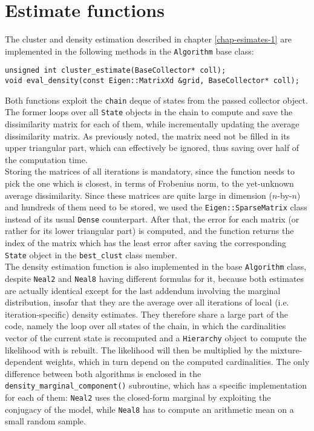 \section{Estimate functions}
The cluster and density estimation described in chapter \ref{chap-esimates-1} are implemented in the following methods in the \verb|Algorithm| base class:
\begin{verbatim}
unsigned int cluster_estimate(BaseCollector* coll);
void eval_density(const Eigen::MatrixXd &grid, BaseCollector* coll);
\end{verbatim}
Both functions exploit the \verb|chain| deque of states from the passed collector object. \\
The former loops over all \verb|State| objects in the chain to compute and save the dissimilarity matrix for each of them, while incrementally updating the average dissimilarity matrix.
As previously noted, the matrix need not be filled in its upper triangular part, which can effectively be ignored, thus saving over half of the computation time. \\
Storing the matrices of all iterations is mandatory, since the function needs to pick the one which is closest, in terms of Frobenius norm, to the yet-unknown average dissimilarity.
Since these matrices are quite large in dimension ($n$-by-$n$) and hundreds of them need to be stored, we used the \verb|Eigen::SparseMatrix| class instead of its usual \verb|Dense| counterpart.
After that, the error for each matrix (or rather for its lower triangular part) is computed, and the function returns the index of the matrix which has the least error after saving the corresponding \verb|State| object in the \verb|best_clust| class member. \\[8pt]
The density estimation function is also implemented in the base \verb|Algorithm| class, despite \verb|Neal2| and \verb|Neal8| having different formulas for it, because both estimates are actually identical except for the last addendum involving the marginal distribution, insofar that they are the average over all iterations of local (i.e. iteration-specific) density estimates.
They therefore share a large part of the code, namely the loop over all states of the chain, in which the cardinalities vector of the current state is recomputed and a \verb|Hierarchy| object to compute the likelihood with is rebuilt.
The likelihood will then be multiplied by the mixture-dependent weights, which in turn depend on the computed cardinalities.
The only difference between both algorithms is enclosed in the \verb|density_marginal_component()| subroutine, which has a specific implementation for each of them: \verb|Neal2| uses the closed-form marginal by exploiting the conjugacy of the model, while \verb|Neal8| has to compute an arithmetic mean on a small random sample.
